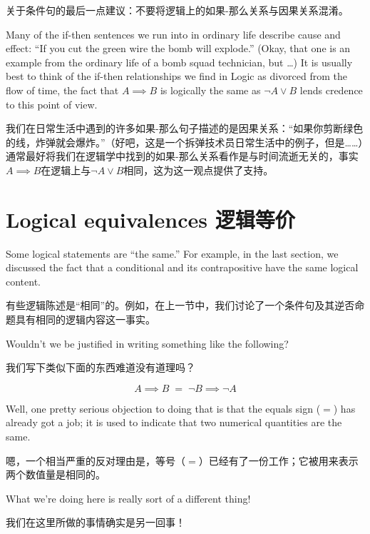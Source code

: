 关于条件句的最后一点建议：不要将逻辑上的如果-那么关系与因果关系混淆。

Many of the if-then sentences
we run into in ordinary life describe cause and effect:  
``If you cut the green wire the bomb will explode.''  (Okay, that one
is an example from the ordinary life of a bomb squad technician, but \ldots)
It is usually best to think of the if-then relationships we find in
Logic as divorced from the flow of time, the fact that $A \implies B$
is logically the same as ${\lnot}A \lor B$ lends credence to this point of view.

我们在日常生活中遇到的许多如果-那么句子描述的是因果关系：“如果你剪断绿色的线，炸弹就会爆炸。”（好吧，这是一个拆弹技术员日常生活中的例子，但是……）通常最好将我们在逻辑学中找到的如果-那么关系看作是与时间流逝无关的，事实$A \implies B$在逻辑上与${\lnot}A \lor B$相同，这为这一观点提供了支持。

\newpage




\newpage

\section{Logical equivalences 逻辑等价}
\label{sec:le}

Some logical statements are ``the same.''  For example, in the last
section, we discussed the fact that a conditional
and its contrapositive have the same logical content.

有些逻辑陈述是“相同”的。例如，在上一节中，我们讨论了一个条件句及其逆否命题具有相同的逻辑内容这一事实。

Wouldn't
we be justified in writing something like the following?

我们写下类似下面的东西难道没有道理吗？

\[ A \implies B \; = \; {\lnot}B \implies {\lnot}A \]

Well, one pretty serious objection to doing that is that the 
equals sign ($=$) has already got a job;
it is used to indicate that
two numerical quantities are the same.

嗯，一个相当严重的反对理由是，等号（$=$）已经有了一份工作；它被用来表示两个数值量是相同的。

What we're doing here is 
really sort of a different thing!

我们在这里所做的事情确实是另一回事！

